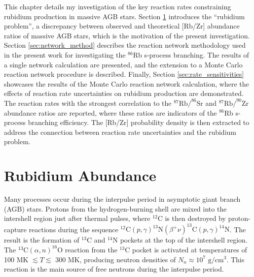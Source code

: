 This chapter details my investigation of the key reaction rates constraining rubidium production in massive AGB stars. Section \ref{sec:Rb_Abundance} introduces the ``rubidium problem'', a discrepancy between observed and theoretical [Rb/Zr] abundance ratios of massive AGB stars, which is the motivation of the present investigation. Section \ref{sec:network_method} describes the reaction network methodology used in the present work for investigating the $^{86}$Rb s-process branching. The results of a single network calculation are presented, and the extension to a Monte Carlo reaction network procedure is described. Finally, Section \ref{sec:rate_sensitivities} showcases the results of the Monte Carlo reaction network calculation, where the effects of reaction rate uncertainties on rubidium production are demonstrated. The reaction rates with the strongest correlation to the $^{87}\mathrm{Rb}/^{86}\mathrm{Sr}$ and $^{87}\mathrm{Rb}/^{90}\mathrm{Zr}$ abundance ratios are reported, where these ratios are indicators of the $^{86}$Rb s-process branching efficiency. The [Rb/Zr] probability density is then extracted to address the connection between reaction rate uncertainties and the rubidium problem. %

\section{Rubidium Abundance} \label{sec:Rb_Abundance}






Many processes occur during the interpulse period in asymptotic giant branch (AGB) stars. Protons from the hydrogen-burning shell are mixed into the intershell region just after thermal pulses, where $^{12}$C is then destroyed by proton-capture reactions during the sequence $^{12}\mathrm{C}(p,\gamma)^{13}\mathrm{N}(\beta^{+}\nu)^{13}\mathrm{C}(p,\gamma)^{14}\mathrm{N}$. The result is the formation of $^{13}$C and $^{14}$N pockets at the top of the intershell region. The $^{13}\mathrm{C}(\alpha,n)^{16}\mathrm{O}$ reaction from the $^{13}$C pocket is activated at temperatures of 100 MK $\lesssim T \lesssim$ 300 MK, producing neutron densities of $N_{n} \approx 10^{7}$ $\mathrm{g}/\mathrm{cm}^{3}$. This reaction is the main source of free neutrons during the interpulse period.


